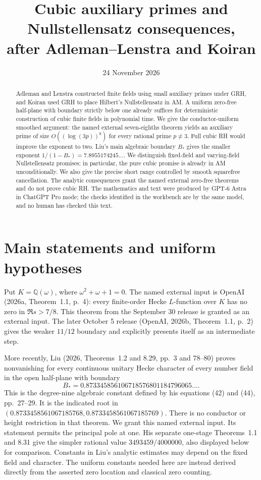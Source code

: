 \documentclass[11pt]{article}
\title{Cubic auxiliary primes and Nullstellensatz consequences,\\
after Adleman--Lenstra and Koiran}
\author{}
\date{24 November 2026}
\newcommand{\Q}{\mathbb Q}
\begin{document}
\maketitle
\begin{abstract}
Adleman and Lenstra constructed finite fields using small auxiliary primes
under GRH, and Koiran used GRH to place Hilbert's Nullstellensatz in AM.
A uniform zero-free half-plane with boundary strictly below one already
suffices for deterministic construction of cubic finite fields in polynomial
time. We give the conductor-uniform smoothed argument: the named external
seven-eighths theorem yields an auxiliary prime of size
$O((\log(3p))^8)$ for every rational prime $p\ne3$. Full cubic RH would
improve the exponent to two. Liu's main algebraic boundary $B_*$ gives the
smaller exponent $1/(1-B_*)=7.8955174245\ldots$. We distinguish fixed-field and
varying-field Nullstellensatz promises; in particular, the pure cubic
promise is already in AM unconditionally. We also give the precise short
range controlled by smooth squarefree cancellation.
The analytic consequences grant the named external zero-free theorems
and do not prove cubic RH. The mathematics and text were produced by GPT-6 Astra
in ChatGPT Pro mode; the checks identified in the workbench are by
the same model, and no human has checked this text.
\end{abstract}

\section{Main statements and uniform hypotheses}
Put $K=\Q(\omega)$, where $\omega^2+\omega+1=0$.
The named external input is OpenAI (2026a, Theorem~1.1, p.~4):
every finite-order Hecke $L$-function over $K$ has no zero in
$\Re s>7/8$. This theorem from the September 30 release is
granted as an external input. The later October 5 release
(OpenAI, 2026b, Theorem~1.1, p.~2) gives the weaker $11/12$ boundary
and explicitly presents itself as an intermediate step.

More recently, Liu (2026, Theorems~1.2 and 8.29, pp.~3 and 78--80)
proves nonvanishing for every continuous unitary Hecke character of every
number field in the open half-plane with boundary
\[
 B_*=0.873345856106718576801184796065\ldots.                   \tag{1.0}
\]
This is the degree-nine algebraic constant defined by his equations
(42) and (44), pp.~27--29. It is the indicated root in
$(0.8733458561067185768,0.8733458561067185769)$.
There is no conductor or height restriction in that theorem.
We grant this named external input. Its statement permits the
principal pole at one.
His separate one-stage Theorems~1.1 and 8.31 give the simpler rational
value $3493459/4000000$, also displayed below for comparison.
Constants in Liu's analytic estimates may depend on the fixed field
and character. The uniform constants needed here are instead derived
directly from the asserted zero location and classical zero counting.
\end{document}
